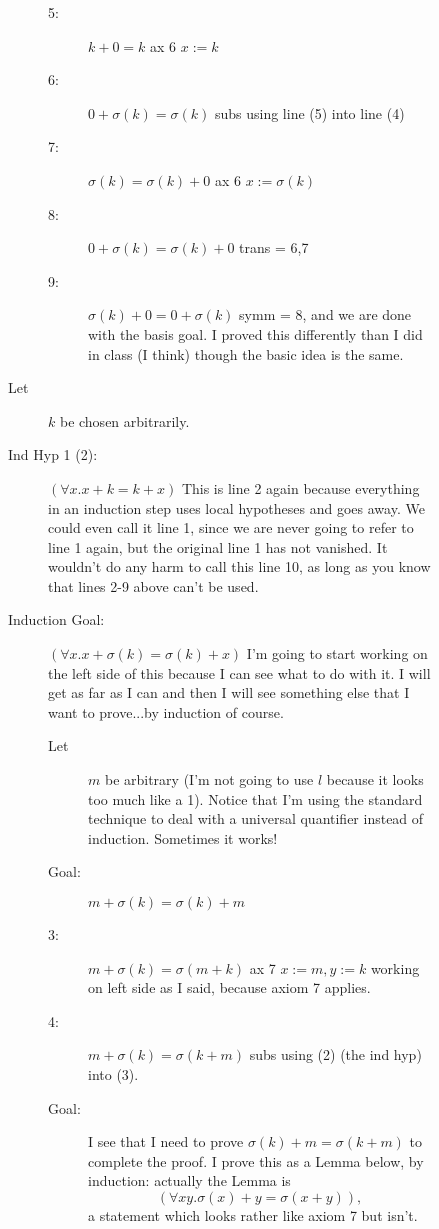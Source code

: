 \documentclass[12pt]{book}
\begin{document}
\begin{description}
\begin{description}
\begin{description}
\begin{description}
\item[5:]  $k+0=k$  ax 6 $x:=k$

\item[6:]  $0+\sigma(k)=\sigma(k)$  subs using line (5) into line (4)

\item[7:]  $\sigma(k)=\sigma(k)+0$  ax 6 $x:=\sigma(k)$

\item[8:]  $0+\sigma(k)=\sigma(k)+0$  trans = 6,7

\item[9:]  $\sigma(k)+0 = 0+\sigma(k)$  symm = 8, and we are done with the basis goal.  I proved this differently than I did in class (I think) though the basic idea is the same.


\end{description}

\item[Let] $k$ be chosen arbitrarily.

\item[Ind Hyp 1 (2):]  $(\forall x.x+k=k+x)$  This is line 2 again because everything in an induction step uses local hypotheses and goes away.  We could even call it line 1, since we are never going to refer to line 1 again, but the original line
1 has not vanished.  It wouldn't do any harm to call this line 10, as long as you know that lines 2-9 above can't be used.

\item[Induction Goal:]  $(\forall x.x+\sigma(k)=\sigma(k)+x)$  I'm going to start working on the left side of this because I can see what to do with it.  I will get as far as I can and then I will see something else that I want to prove...by induction of course.
\begin{description}
\item[Let] $m$ be arbitrary (I'm not going to use $l$ because it looks too much like a 1).  Notice that I'm using the standard technique to deal with a universal quantifier instead of induction.  Sometimes it works!

\item[Goal:]  $m+\sigma(k)=\sigma(k)+m$

\item[3:]  $m+\sigma(k) = \sigma(m+k)$  ax 7 $x:=m, y:=k$  working on left side as I said, because axiom 7 applies.

\item[4:]  $m+\sigma(k)=\sigma(k+m)$  subs using (2) (the ind hyp) into (3).

\item[Goal:]  I see that I need to prove $\sigma(k)+m = \sigma(k+m)$ to complete the proof.  I prove this as a Lemma below, by induction:  actually the Lemma is $$(\forall xy.\sigma(x)+y=\sigma(x+y)),$$a statement which looks rather like axiom 7 but isn't.


\end{description}
\end{description}
\end{description}
\end{description}
\end{document}
